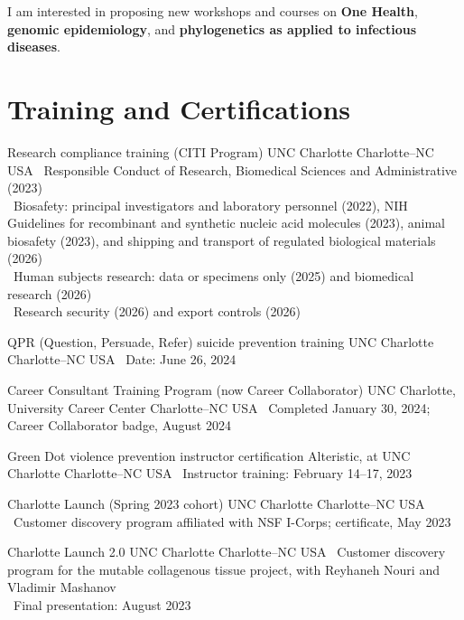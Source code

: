 \documentclass[11pt, letterpaper, sans]{moderncv}
\begin{document}
\vspace{0.5em}

I am interested in proposing new workshops and courses on \textbf{One Health}, \textbf{genomic epidemiology}, and \textbf{phylogenetics as applied to infectious diseases}.


\section{Training and Certifications}
		{Research compliance training (CITI Program)}
		{UNC Charlotte}
		{Charlotte--NC}
		{USA}
		{
			\textbullet~Responsible Conduct of Research, Biomedical Sciences and Administrative (2023)\\
			\textbullet~Biosafety: principal investigators and laboratory personnel (2022), NIH Guidelines for recombinant and synthetic nucleic acid molecules (2023), animal biosafety (2023), and shipping and transport of regulated biological materials (2026)\\
			\textbullet~Human subjects research: data or specimens only (2025) and biomedical research (2026)\\
			\textbullet~Research security (2026) and export controls (2026)
		}

		{QPR (Question, Persuade, Refer) suicide prevention training}
		{UNC Charlotte}
		{Charlotte--NC}
		{USA}
		{
			\textbullet~Date: June 26, 2024
		}

		{Career Consultant Training Program (now Career Collaborator)}
		{UNC Charlotte, University Career Center}
		{Charlotte--NC}
		{USA}
		{
			\textbullet~Completed January 30, 2024; Career Collaborator badge, August 2024
		}

		{Green Dot violence prevention instructor certification}
		{Alteristic, at UNC Charlotte}
		{Charlotte--NC}
		{USA}
		{
			\textbullet~Instructor training: February 14--17, 2023
		}

		{Charlotte Launch (Spring 2023 cohort)}
		{UNC Charlotte}
		{Charlotte--NC}
		{USA}
		{
			\textbullet~Customer discovery program affiliated with NSF I-Corps; certificate, May 2023
		}

		{Charlotte Launch 2.0}
		{UNC Charlotte}
		{Charlotte--NC}
		{USA}
		{
			\textbullet~Customer discovery program for the mutable collagenous tissue project, with Reyhaneh Nouri and Vladimir Mashanov\\
			\textbullet~Final presentation: August 2023
		}
\end{document}
